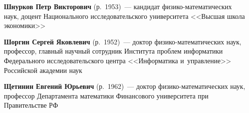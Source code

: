 \begin{multicols}{2}
\vspace*{2pt}

\noindent
\textbf{Шнурков Петр Викторович} (р.\ 1953)~--- кандидат фи\-зи\-ко-ма\-те\-ма\-ти\-че\-ских наук, доцент 
Национального исследовательского университета <<Высшая школа экономики>>

\vspace*{2pt}

\noindent
\textbf{Шоргин Сергей Яковлевич} (р.\ 1952)~--- 
доктор фи\-зи\-ко-ма\-те\-ма\-ти\-че\-ских наук, профессор, 
главный научный сотрудник Института проб\-лем информатики Федерального исследовательского цент\-ра 
<<Информатика и~управ\-ле\-ние>> Российской академии наук

\vspace*{2pt}

\noindent
\textbf{Щетинин Евгений Юрьевич} (р.\ 1962)~--- доктор фи\-зи\-ко-ма\-те\-ма\-ти\-че\-ских наук, 
профессор Департамента математики Финансового университета при Правительстве РФ












\def\leftkol{ОБ АВТОРАХ}

\def\rightkol{ОБ АВТОРАХ}


 \label{end\stat}



\end{multicols}

\def\leftkol{ОБ АВТОРАХ}
\def\rightkol{ОБ АВТОРАХ}

\newpage